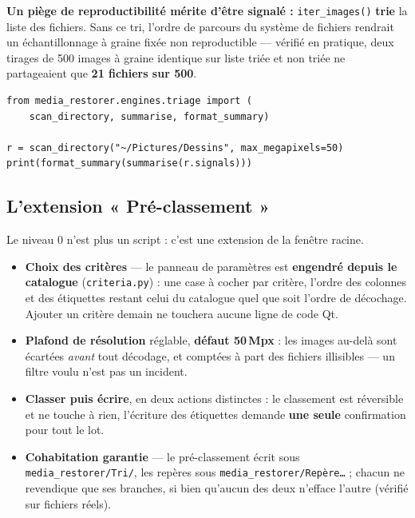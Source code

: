 \documentclass[11pt,a4paper]{article}
\newcommand{\alerte}[1]{\textcolor{alerte}{\textbf{#1}}}
\begin{document}
\alerte{Un piège de reproductibilité mérite d'être signalé :}
\texttt{iter\_images()} \textbf{trie} la liste des fichiers. Sans ce tri,
l'ordre de parcours du système de fichiers rendrait un échantillonnage à graine
fixée non reproductible — vérifié en pratique, deux tirages de 500 images à
graine identique sur liste triée et non triée ne partageaient que
\textbf{21 fichiers sur 500}.

\begin{verbatim}
from media_restorer.engines.triage import (
    scan_directory, summarise, format_summary)

r = scan_directory("~/Pictures/Dessins", max_megapixels=50)
print(format_summary(summarise(r.signals)))
\end{verbatim}

\subsection{L'extension « Pré-classement »}
\label{sec:extension}

Le niveau 0 n'est plus un script : c'est une extension de la fenêtre racine.

\begin{itemize}[leftmargin=*,itemsep=3pt]
  \item \textbf{Choix des critères} — le panneau de paramètres est
  \textbf{engendré depuis le catalogue} (\texttt{criteria.py}) : une case à
  cocher par critère, l'ordre des colonnes et des étiquettes restant celui du
  catalogue quel que soit l'ordre de décochage. Ajouter un critère demain ne
  touchera aucune ligne de code Qt.
  \item \textbf{Plafond de résolution} réglable, \textbf{défaut 50\,Mpx} : les
  images au-delà sont écartées \emph{avant} tout décodage, et comptées à part
  des fichiers illisibles — un filtre voulu n'est pas un incident.
  \item \textbf{Classer puis écrire}, en deux actions distinctes : le
  classement est réversible et ne touche à rien, l'écriture des étiquettes
  demande \textbf{une seule} confirmation pour tout le lot.
  \item \textbf{Cohabitation garantie} — le pré-classement écrit sous
  \texttt{media\_restorer/Tri/}, les repères sous \texttt{media\_restorer/Repère…} ;
  chacun ne revendique que ses branches, si bien qu'aucun des deux n'efface
  l'autre (vérifié sur fichiers réels).
\end{itemize}

\end{document}
